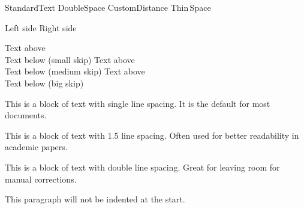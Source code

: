 


Standard\quad Text %
Double\qquad Space %
Custom\hspace{2cm}Distance %
Thin\,Space %

Left side \hfill Right side



Text above \smallskip \\ Text below (small skip)
Text above \medskip \\ Text below (medium skip)
Text above \bigskip \\ Text below (big skip)

\vspace{1.5cm} %




{\singlespacing This is a block of text with single line spacing. It is the default for most documents.}

{\onehalfspacing This is a block of text with 1.5 line spacing. Often used for better readability in academic papers.}

{\doublespacing This is a block of text with double line spacing. Great for leaving room for manual corrections.}



\noindent This paragraph will not be indented at the start.

